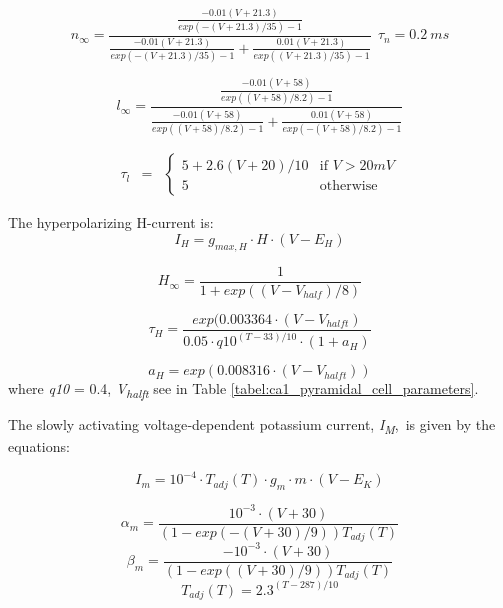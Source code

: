 \documentclass[a4paper,12pt]{article}
\begin{document}
\begin{equation}
n_{\infty} = \frac{\frac{-0.01(V+21.3)}{exp(-(V+21.3)/35)-1}}{\frac{-0.01(V+21.3)}{exp(-(V+21.3)/35)-1} + \frac{0.01(V+21.3)}{exp( (V+21.3)/35)-1} } \ \ \tau_n=0.2 \ ms
\end{equation}

\begin{equation}
l_{\infty} = \frac{\frac{-0.01(V+58)}{exp( (V+58)/8.2)-1}}{\frac{-0.01(V+58)}{exp( (V+58)/8.2)-1} + \frac{0.01(V+58)}{exp(-(V+58)/8.2)-1}}
\end{equation}

\begin{equation}
\begin{matrix}
\tau_l & =
& \left\{
\begin{matrix}
5+2.6(V+20)/10 & \mbox{if } V > 20 mV \\
5 & \mbox{otherwise }
\end{matrix} \right.
\end{matrix}
\end{equation}


The hyperpolarizing H-current is:
\begin{equation}
I_H=g_{max, H} \cdot H \cdot (V-E_H)
\end{equation}

\begin{equation}
H_{\infty }=\frac {1}{1+exp((V-V_{half})/8)}  
\end{equation}

\begin{equation}
\tau_{H}=\frac{exp( 0.003364\cdot
	(V-V_{halft})}{0.05 \cdot q10^{(T-33)/10} \cdot
	(1+a_{H})}
\end{equation}


\begin{equation}
a_{H}=exp( 0.008316 \cdot (V-V_{halft}))
\end{equation}
where \textit{q10} =  0.4, \textit{V\textsubscript{halft}}
see in Table \ref{tabel:ca1_pyramidal_cell_parameters}.

The slowly activating voltage‑dependent potassium current, \textit{I}\textit{\textsubscript{M}},~is given by the
equations:


\begin{equation}
I_m=10^{-4}\cdot T_{adj}(T)\cdot g_m\cdot m\cdot
(V-E_K)
\end{equation}


\begin{equation}
\alpha_m =  \frac{10^{-3}\cdot(V+30)}{(1-exp(-(V+30)/9))T_{adj}(T)} 
\end{equation}
\begin{equation}
\beta_m = \frac{ -10^{-3}\cdot(V+30)}{(1-exp((V+30)/9))T_{adj}(T)}
\end{equation}
\begin{equation}
T_{adj}(T)=2.3^{(T - 287)/10}
\end{equation}
\end{document}

